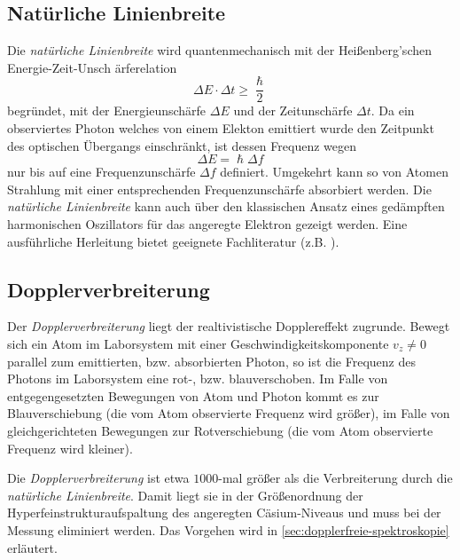 \documentclass[../bericht.tex]{subfiles}
\begin{document}
      \subsection{Nat\"urliche Linienbreite}
      \label{subsec:natuerliche-linienbreite}

        Die \textit{nat\"urliche Linienbreite} wird quantenmechanisch mit der Hei\ss{}enberg'schen Energie-Zeit-Unsch \"arferelation
        \begin{equation*}
          \Delta E \cdot \Delta t \ge \frac{\hslash}{2}
        \end{equation*}
        begr\"undet, mit der Energieunsch\"arfe $\Delta E$ und der Zeitunsch\"arfe $\Delta t$. Da ein observiertes Photon welches von einem Elekton emittiert wurde den Zeitpunkt des optischen Übergangs einschr\"ankt, ist dessen Frequenz wegen
        \begin{equation*}
          \Delta E = \hslash \Delta f
        \end{equation*}
        nur bis auf eine Frequenzunsch\"arfe $\Delta f$ definiert. Umgekehrt kann so von Atomen Strahlung mit einer entsprechenden Frequenzunsch\"arfe absorbiert werden. Die \textit{nat\"urliche Linienbreite} kann auch \"uber den klassischen Ansatz eines ged\"ampften harmonischen Oszillators f\"ur das angeregte Elektron gezeigt werden. Eine ausf\"uhrliche Herleitung bietet geeignete Fachliteratur (z.B. \cite{dem:exp3-linienbreite}).


      \subsection{Dopplerverbreiterung}
      \label{subsec:dopplerverbreiterung}

        Der \textit{Dopplerverbreiterung} liegt der realtivistische Dopplereffekt zugrunde. Bewegt sich ein Atom im Laborsystem mit einer Geschwindigkeitskomponente $v_z\ne 0$ parallel zum emittierten, bzw. absorbierten Photon, so ist die Frequenz des Photons im Laborsystem eine rot-, bzw. blauverschoben. Im Falle von entgegengesetzten Bewegungen von Atom und Photon kommt es zur Blauverschiebung (die vom Atom observierte Frequenz wird gr\"o\ss{}er), im Falle von gleichgerichteten Bewegungen zur Rotverschiebung (die vom Atom observierte Frequenz wird kleiner).

        Die \textit{Dopplerverbreiterung} ist etwa $1000$-mal gr\"o\ss{}er als die Verbreiterung durch die \textit{nat\"urliche Linienbreite}. Damit liegt sie in der Gr\"o\ss{}enordnung der Hyperfeinstrukturaufspaltung des angeregten C\"asium-Niveaus und muss bei der Messung eliminiert werden. Das Vorgehen wird in \cref{sec:dopplerfreie-spektroskopie} erl\"autert.
\end{document}
